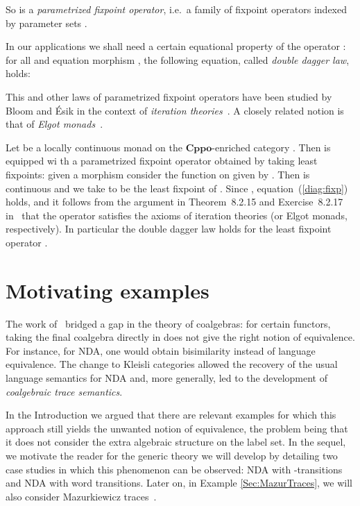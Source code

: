 \documentclass[oribibl,envcountsame,envcountsect,runningheads]{llncs}
\newcommand{\cat}[1]{\ensuremath{\mathbf{#1}}}
\newcommand{\cppo}{\cat{Cppo}}
\renewcommand{\>}{\rangle}
\def\refeq#1{(\ref{#1})}
\begin{document}
So  is a \emph{parametrized fixpoint operator}, i.e.~a family of fixpoint operators indexed by parameter sets .
\begin{remark} \label{rmk:doubledagger} In our
applications we shall need a certain equational property of the operator : for all  and equation morphism ,
the following equation, called \emph{double dagger law}, holds:

This and other laws of parametrized fixpoint operators have been
studied by Bloom and \'Esik in the context of \emph{iteration
  theories}~\cite{be93}. A closely related notion is that of \emph{Elgot monads}~\cite{amv10,amv11}.
\end{remark}
\begin{example}\label{ex:LfpSolCPO}
  Let  be a locally continuous monad on the \cppo-enriched category . Then  is equipped wi th a parametrized fixpoint operator obtained by taking least fixpoints: given a morphism  consider the function  on  given by . Then  is continuous and we take  to be the least fixpoint of . Since , equation~\refeq{diag:fixp} holds, and it follows from the argument in Theorem~8.2.15 and Exercise~8.2.17 in~\cite{be93} that the operator  satisfies the axioms of iteration theories (or Elgot monads, respectively). In particular the double dagger law holds for the least fixpoint operator .
\end{example}

\section{Motivating examples}\label{SSec:Mot}

The work of~\cite{HasuoJS:07} bridged a gap in the theory of coalgebras: for certain functors, taking the final coalgebra directly in  does not give the right notion of equivalence. For instance, for NDA, one would obtain bisimilarity instead of language equivalence. The change to Kleisli categories allowed the recovery of the usual language semantics for NDA and, more generally, led to the development of \emph{coalgebraic trace semantics}.


In the Introduction we argued that there are relevant examples for which this approach still yields the unwanted notion of equivalence, the problem being that it does not consider the extra algebraic structure on the label set. In the sequel, we motivate the reader for the generic theory we will develop by detailing two case studies in which this phenomenon can be observed: NDA with -transitions and NDA with word transitions. Later on, in Example \ref{Sec:MazurTraces}, we will also consider Mazurkiewicz traces~\cite{Mazurkiewicz77}.
\end{document}
